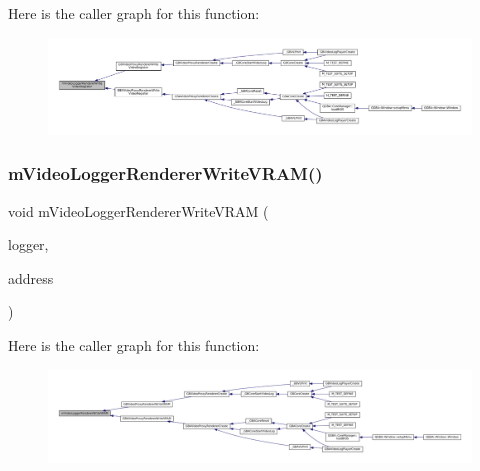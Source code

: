 Here is the caller graph for this function\+:
\nopagebreak
\begin{figure}[H]
\begin{center}
\leavevmode
\includegraphics[width=350pt]{video-logger_8c_a92cbf883be4c238b029ff28a8b905841_icgraph}
\end{center}
\end{figure}
\mbox{\label{video-logger_8c_ad44e459bc3864018f661249901f07cf2}} 
\subsubsection{\texorpdfstring{m\+Video\+Logger\+Renderer\+Write\+V\+R\+A\+M()}{mVideoLoggerRendererWriteVRAM()}}
{\footnotesize\ttfamily void m\+Video\+Logger\+Renderer\+Write\+V\+R\+AM (\begin{DoxyParamCaption}\item[{struct m\+Video\+Logger $\ast$}]{logger,  }\item[{uint32\+\_\+t}]{address }\end{DoxyParamCaption})}

Here is the caller graph for this function\+:
\nopagebreak
\begin{figure}[H]
\begin{center}
\leavevmode
\includegraphics[width=350pt]{video-logger_8c_ad44e459bc3864018f661249901f07cf2_icgraph}
\end{center}
\end{figure}
\mbox{\label{video-logger_8c_a1548cd96c67d81fecdd4e71df06c6b2f}} 

